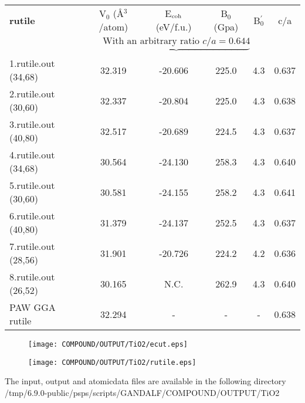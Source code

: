 \documentclass[onecolumn]{revtex4}
\begin{document}
\begin{center}
\begin{tabular}{lccccc}
\hline
\hline
\bf{rutile}&V$_0$ (\AA$^3$/atom)&E$_{\rm coh}$ (eV/f.u.)&B$_0$ (Gpa)&B$_0^{'}$& c/a \\
&\multicolumn{4}{c}{$\underbrace{\mbox{With an arbitrary ratio } c/a=0.644}_{}$}& \\
\hline
1.rutile.out (34,68)& 32.319 &-20.606 & 225.0 & 4.3 & 0.637  \\ 
2.rutile.out (30,60)& 32.337 &-20.804 & 225.0 & 4.3 & 0.638  \\ 
3.rutile.out (40,80)& 32.517 &-20.689 & 224.5 & 4.3 & 0.637  \\ 
4.rutile.out (34,68)& 30.564 &-24.130 & 258.3 & 4.3 & 0.640  \\ 
5.rutile.out (30,60)& 30.581 &-24.155 & 258.2 & 4.3 & 0.641  \\ 
6.rutile.out (40,80)& 31.379 &-24.137 & 252.5 & 4.3 & 0.637  \\ 
7.rutile.out (28,56)& 31.901 &-20.726 & 224.2 & 4.2 & 0.636  \\ 
8.rutile.out (26,52)& 30.165 &N.C.& 262.9 & 4.3 & 0.640  \\ 
PAW GGA rutile~\cite{Geng_PRB68_2003} & 32.294 & - & - & - & 0.638 \\ %
\hline
\hline
\end{tabular}
\end{center}
\begin{figure}[h] 
\centering 
\texttt{[image: COMPOUND/OUTPUT/TiO2/ecut.eps]}
\end{figure}
\begin{figure}[h] 
\centering 
\texttt{[image: COMPOUND/OUTPUT/TiO2/rutile.eps]}
\end{figure}
\begin{htmlonly} 
The input, output and atomicdata files are available in the following directory 
  {/tmp/6.9.0-public/psps/scripts/GANDALF/COMPOUND/OUTPUT/TiO2} 
\end{htmlonly} 

\end{document}
